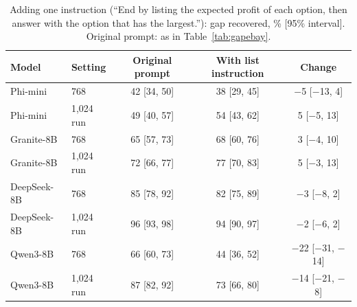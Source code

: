 \begin{table}[t]
\caption{Adding one instruction (``End by listing the expected profit of each option, then answer with the option that has the largest.''): gap recovered, \% [95\% interval]. Original prompt: as in Table~\ref{tab:gapebay}.}
\label{tab:prompt}
\footnotesize
\centering

\begin{tabular}{llccc}
\toprule
Model & Setting & Original prompt & With list instruction & Change \\
\midrule
Phi-mini & 768 & 42 [34, 50] & 38 [29, 45] & $-$5 [$-$13, 4] \\
Phi-mini & 1,024 run & 49 [40, 57] & 54 [43, 62] & 5 [$-$5, 13] \\
Granite-8B & 768 & 65 [57, 73] & 68 [60, 76] & 3 [$-$4, 10] \\
Granite-8B & 1,024 run & 72 [66, 77] & 77 [70, 83] & 5 [$-$3, 13] \\
DeepSeek-8B & 768 & 85 [78, 92] & 82 [75, 89] & $-$3 [$-$8, 2] \\
DeepSeek-8B & 1,024 run & 96 [93, 98] & 94 [90, 97] & $-$2 [$-$6, 2] \\
Qwen3-8B & 768 & 66 [60, 73] & 44 [36, 52] & $-$22 [$-$31, $-$14] \\
Qwen3-8B & 1,024 run & 87 [82, 92] & 73 [66, 80] & $-$14 [$-$21, $-$8] \\
\bottomrule
\end{tabular}
\end{table}
